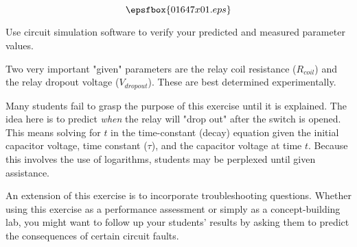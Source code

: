 

$$\epsfbox{01647x01.eps}$$

\vfil \eject






Use circuit simulation software to verify your predicted and measured parameter values.







Two very important "given" parameters are the relay coil resistance ($R_{coil}$) and the relay dropout voltage ($V_{dropout}$).  These are best determined experimentally.

Many students fail to grasp the purpose of this exercise until it is explained.  The idea here is to predict {\it when} the relay will "drop out" after the switch is opened.  This means solving for $t$ in the time-constant (decay) equation given the initial capacitor voltage, time constant ($\tau$), and the capacitor voltage at time $t$.  Because this involves the use of logarithms, students may be perplexed until given assistance.

An extension of this exercise is to incorporate troubleshooting questions.  Whether using this exercise as a performance assessment or simply as a concept-building lab, you might want to follow up your students' results by asking them to predict the consequences of certain circuit faults.




